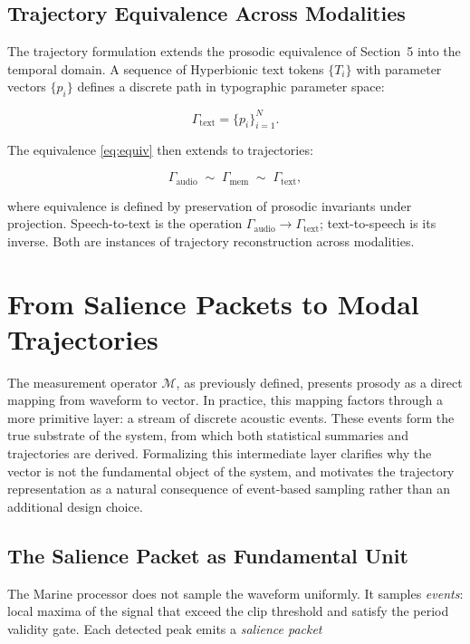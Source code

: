 \documentclass[12pt, a4paper]{article}
\begin{document}
\subsection{Trajectory Equivalence Across Modalities}

The trajectory formulation extends the prosodic equivalence of Section~5 into the temporal domain. A sequence of Hyperbionic text tokens $\{T_i\}$ with parameter vectors $\{p_i\}$ defines a discrete path in typographic parameter space:

\begin{equation}
\Gamma_{\mathrm{text}} = \{p_i\}_{i=1}^N.
\label{eq:Gtext}
\end{equation}

The equivalence \eqref{eq:equiv} then extends to trajectories:

\begin{equation}
\Gamma_{\mathrm{audio}} \;\sim\; \Gamma_{\mathrm{mem}} \;\sim\; \Gamma_{\mathrm{text}},
\label{eq:trajequiv}
\end{equation}

where equivalence is defined by preservation of prosodic invariants under projection. Speech-to-text is the operation $\Gamma_{\mathrm{audio}} \to \Gamma_{\mathrm{text}}$; text-to-speech is its inverse. Both are instances of trajectory reconstruction across modalities.


\section{From Salience Packets to Modal Trajectories}

The measurement operator $\mathcal{M}$, as previously defined, presents prosody as a direct mapping from waveform to vector. In practice, this mapping factors through a more primitive layer: a stream of discrete acoustic events. These events form the true substrate of the system, from which both statistical summaries and trajectories are derived. Formalizing this intermediate layer clarifies why the vector is not the fundamental object of the system, and motivates the trajectory representation as a natural consequence of event-based sampling rather than an additional design choice.

\subsection{The Salience Packet as Fundamental Unit}

The Marine processor does not sample the waveform uniformly. It samples \emph{events}: local maxima of the signal that exceed the clip threshold and satisfy the period validity gate. Each detected peak emits a \emph{salience packet}
\end{document}
